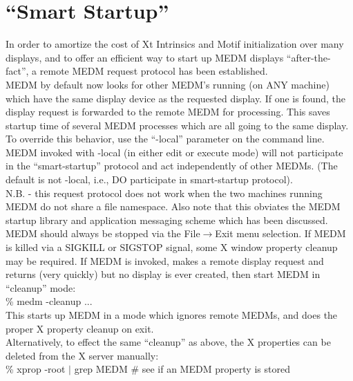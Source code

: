 \section{``Smart Startup''}

In order to amortize the cost of Xt Intrinsics and Motif initialization
over many displays, and to offer an efficient way to start up MEDM
displays ``after-the-fact'', a remote MEDM request protocol has
been established.  \\

\noindent MEDM by default now looks for other MEDM's running (on ANY machine)
which have the same display device as the requested display.  If one is found,
the display request is forwarded to the remote MEDM for processing.  This
saves startup time of several MEDM processes which are all going to the
same display.\\

\noindent To override this behavior, use the ``-local'' parameter on the command
line.  MEDM invoked with -local (in either edit or execute mode) will
not participate in the ``smart-startup'' protocol and act independently
of other MEDMs.  (The default is not -local, i.e., DO participate in
smart-startup protocol).\\

\noindent N.B. - this request protocol does not work when the two machines
running MEDM do not share a file namespace.  Also note that this obviates the
MEDM startup library and application messaging scheme which has been 
discussed.\\

\noindent MEDM should always be stopped via the File$\rightarrow$Exit
menu selection.
If MEDM is killed via a SIGKILL or SIGSTOP signal, some X window
property cleanup may be required.  If MEDM is invoked, makes a remote
display request and returns (very quickly) but no display is ever
created, then start MEDM in ``cleanup'' mode:\\

\% medm -cleanup ...\\

\noindent This starts up MEDM in a mode which ignores remote MEDMs, and does
the proper X property cleanup on exit.\\

\noindent Alternatively, to effect the same ``cleanup'' as above, the
X properties can be deleted from the X server manually:\\

\% xprop -root $|$ grep MEDM \hspace{24pt} \# see if an MEDM property is stored\\

